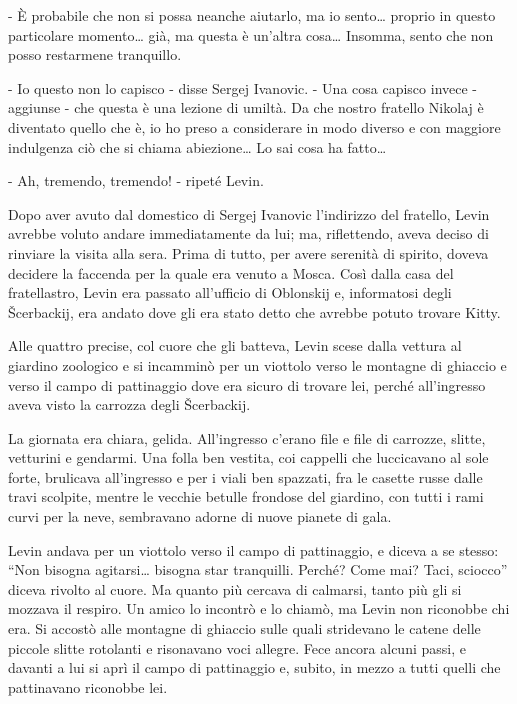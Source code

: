 - È probabile che non si possa neanche aiutarlo, ma io sento\ldots{} proprio in questo particolare momento\ldots{} già, ma questa è un'altra cosa\ldots{} Insomma, sento che non posso restarmene tranquillo. 

- Io questo non lo capisco - disse Sergej Ivanovic. - Una cosa capisco invece - aggiunse - che questa è una lezione di umiltà. Da che nostro fratello Nikolaj è diventato quello che è, io ho preso a considerare in modo diverso e con maggiore indulgenza ciò che si chiama abiezione\ldots{} Lo sai cosa ha fatto\ldots{} 

- Ah, tremendo, tremendo! - ripeté Levin. 

Dopo aver avuto dal domestico di Sergej Ivanovic l'indirizzo del fratello, Levin avrebbe voluto andare immediatamente da lui; ma, riflettendo, aveva deciso di rinviare la visita alla sera. Prima di tutto, per avere serenità di spirito, doveva decidere la faccenda per la quale era venuto a Mosca. Così dalla casa del fratellastro, Levin era passato all'ufficio di Oblonskij e, informatosi degli Šcerbackij, era andato dove gli era stato detto che avrebbe potuto trovare Kitty. 

\label{ix} 

Alle quattro precise, col cuore che gli batteva, Levin scese dalla vettura al giardino zoologico e si incamminò per un viottolo verso le montagne di ghiaccio e verso il campo di pattinaggio dove era sicuro di trovare lei, perché all'ingresso aveva visto la carrozza degli Šcerbackij. 

La giornata era chiara, gelida. All'ingresso c'erano file e file di carrozze, slitte, vetturini e gendarmi. Una folla ben vestita, coi cappelli che luccicavano al sole forte, brulicava all'ingresso e per i viali ben spazzati, fra le casette russe dalle travi scolpite, mentre le vecchie betulle frondose del giardino, con tutti i rami curvi per la neve, sembravano adorne di nuove pianete di gala. 

Levin andava per un viottolo verso il campo di pattinaggio, e diceva a se stesso: ``Non bisogna agitarsi\ldots{} bisogna star tranquilli. Perché? Come mai? Taci, sciocco'' diceva rivolto al cuore. Ma quanto più cercava di calmarsi, tanto più gli si mozzava il respiro. Un amico lo incontrò e lo chiamò, ma Levin non riconobbe chi era. Si accostò alle montagne di ghiaccio sulle quali stridevano le catene delle piccole slitte rotolanti e risonavano voci allegre. Fece ancora alcuni passi, e davanti a lui si aprì il campo di pattinaggio e, subito, in mezzo a tutti quelli che pattinavano riconobbe lei. 

